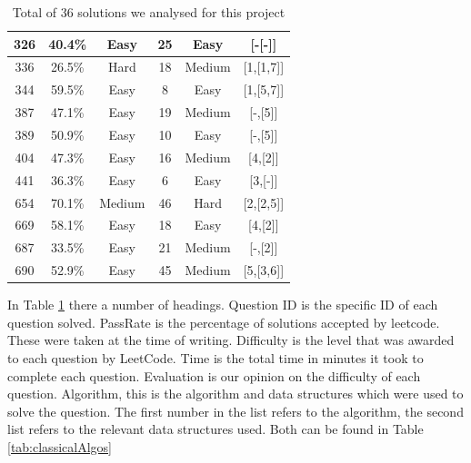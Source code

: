 \documentclass[10pt,twocolumn,hidelinks]{IEEEtran}
\begin{document}
\begin{table}
\begin{tabular}{|c| c| c| c| c| c|}
  	\hline
 	326 & 40.4\% &Easy  &25  &Easy&[-[-]]\\
   	\hline
  	336 & 26.5\% &Hard &18  &Medium&[1,[1,7]]\\
  	\hline
 	344 & 59.5\% &Easy  &8  &Easy&[1,[5,7]]\\
  	\hline
 	387 & 47.1\% &Easy  & 19 &Medium&[-,[5]]\\
  	\hline
 	389 & 50.9\% &Easy  & 10 &Easy& [-,[5]]\\
  	\hline
 	404 & 47.3\% &Easy  &16  &Medium&[4,[2]]\\
	\hline
 	441 & 36.3\% &Easy  &6&Easy &[3,[-]]\\ 	
  	\hline
 	654 & 70.1\% &Medium  &46  &Hard&[2,[2,5]]\\
  	\hline
	669 &  58.1\%& Easy &18  &Easy&[4,[2]]\\
  	\hline
	687 &  33.5\%& Easy &21  &Medium&[-,[2]]\\
  	\hline
 	690 &  52.9\%& Easy &   45&Medium&[5,[3,6]]\\[1ex]
 	\hline
\end{tabular}
\caption{Total of 36 solutions we analysed for this project}
\label{tab:tabSols}
\end{table}
\par In Table \ref{tab:tabSols} there a number of headings. Question ID is the specific ID of each question solved. PassRate is the percentage of solutions accepted by leetcode. These were taken at the time of writing. Difficulty is the level that was awarded to each question by LeetCode. Time is the total time in minutes it took to complete each question. Evaluation is our opinion on the difficulty of each question. Algorithm, this is the algorithm and data structures which were used to solve the question. The first number in the list refers to the algorithm, the second list refers to the relevant data structures used. Both can be found in Table {\ref{tab:classicalAlgos}}
\end{document}
